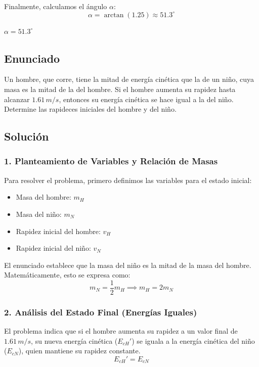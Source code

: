 \documentclass[12pt, a4paper]{article}
\begin{document}
Finalmente, calculamos el ángulo $\alpha$:
$$ \alpha = \arctan(1.25) \approx 51.3^\circ $$

\begin{tcolorbox}[colback=green!5!white, colframe=green!50!black, title=Respuesta Final]
\centering \Large $\alpha = 51.3^\circ$
\end{tcolorbox}

\newpage

\subsection*{Enunciado}
Un hombre, que corre, tiene la mitad de energía cinética que la de un niño, cuya masa es la mitad de la del hombre. Si el hombre aumenta su rapidez hasta alcanzar $1.61 \, \si{m/s}$, entonces su energía cinética se hace igual a la del niño. Determine las rapideces iniciales del hombre y del niño.

\subsection*{Solución}

\subsubsection*{1. Planteamiento de Variables y Relación de Masas}
Para resolver el problema, primero definimos las variables para el estado inicial:
\begin{itemize}
    \item Masa del hombre: $m_H$
    \item Masa del niño: $m_N$
    \item Rapidez inicial del hombre: $v_H$
    \item Rapidez inicial del niño: $v_N$
\end{itemize}

El enunciado establece que la masa del niño es la mitad de la masa del hombre. Matemáticamente, esto se expresa como:
$$ m_N = \frac{1}{2} m_H \implies m_H = 2m_N $$

\subsubsection*{2. Análisis del Estado Final (Energías Iguales)}
El problema indica que si el hombre aumenta su rapidez a un valor final de $1.61 \, \si{m/s}$, su nueva energía cinética ($E_{cH}'$) se iguala a la energía cinética del niño ($E_{cN}$), quien mantiene su rapidez constante.
$$ E_{cH}' = E_{cN} $$
\end{document}
